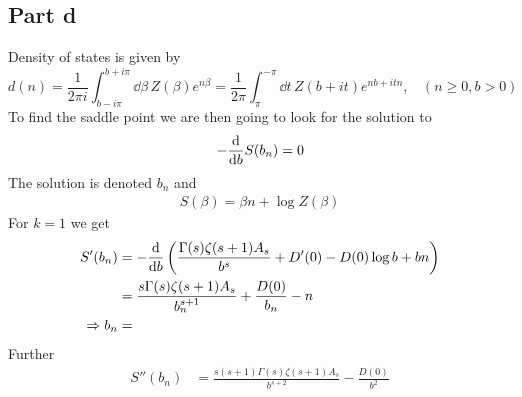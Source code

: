 \documentclass[a4paper,12pt]{article}
\begin{document}
\subsection*{Part d}
Density of states is given by
\begin{equation}
d(n)=\frac{1}{2\pi i}\int_{b-i\pi}^{b+i\pi}\dd \beta\,Z(\beta)e^{n\beta}=\frac{1}{2\pi}\int_{\pi}^{-\pi}\dd t\,Z(b+it)e^{nb+itn},~~~~(n\geq 0,b>0)
\end{equation}
To find the saddle point we are then going to look for the solution to
\begin{equation}
	\begin{aligned}
-	\dv{}{b} S(b_n)= 0
	\end{aligned}
\end{equation}
The solution is denoted $b_n$ and
\begin{equation}
	\begin{aligned}
		S(\beta)=\beta n+ \log Z(\beta)
	\end{aligned}
\end{equation}
For $k=1$ we get
\begin{equation}
	\begin{aligned}
		S'(b_n)&=-
		\dv{}{b}
		\left(\frac{\Gamma(s)\zeta(s+1)A_s}{b^{s}}+	D'(0)-D(0)\log b+bn\right)
\\
&=
\frac{s\Gamma(s)\zeta(s+1)A_s}{b_n^{s+1}}+\frac{D(0)}{b_n}-n\\
\Rightarrow b_n&=
\end{aligned}
\end{equation}
Further
\begin{equation}
	\begin{aligned}
		S''(b_n)&=
		\frac{s(s+1)\Gamma(s)\zeta(s+1)A_s}{b^{s+2}}-\frac{D(0)}{b^2}
	\end{aligned}
\end{equation}
\end{document}
